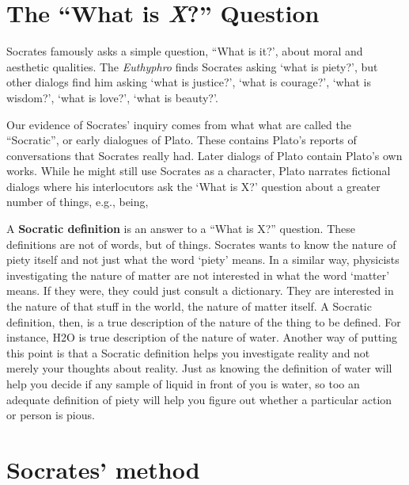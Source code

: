 \documentclass[oneside]{article}
\begin{document}

%

\section*{The ``What is \emph{X}?'' Question}

Socrates famously asks a simple question, ``What is it?', about moral and aesthetic qualities. The \emph{Euthyphro} finds Socrates asking `what is piety?', but other dialogs find him asking `what is justice?', `what is courage?', `what is wisdom?', `what is love?', `what is beauty?'. 

Our evidence of Socrates' inquiry comes from what what are called the  ``Socratic'', or early dialogues of Plato. These contains Plato's reports of conversations that Socrates really had. Later dialogs of Plato contain Plato's own works. While he might still use Socrates as a character, Plato narrates fictional dialogs where his interlocutors ask the `What is X?' question about a greater number of things, e.g., being, 

A \textbf{Socratic definition} is an answer to a ``What is X?'' question. These definitions are not of words, but of things. Socrates wants to know the nature of piety itself and not just what the word `piety' means. In a similar way, physicists investigating the nature of matter are not interested in what the word `matter' means. If they were, they could just consult a dictionary. They are interested in the nature of that stuff in the world, the nature of matter itself.  A Socratic definition, then, is a true description of the nature of the thing to be defined. For instance, H2O is true description of the nature of water. Another way of putting this point is that a Socratic definition helps you investigate reality and not merely your thoughts about reality. Just as knowing the definition of water will help you decide if any sample of liquid in front of you is water, so too an adequate definition of piety will help you figure out whether a particular action or person is pious. 


\section*{Socrates' method}
\end{document}
